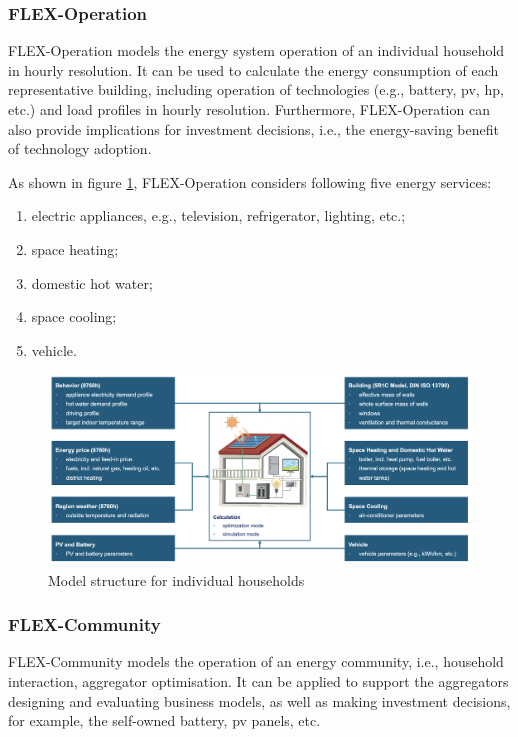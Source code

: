 \subsubsection{FLEX-Operation}


FLEX-Operation models the energy system operation of an individual household in hourly resolution.  
It can be used to calculate the energy consumption of each representative building, including operation of technologies (e.g., battery, \gls{pv}, \gls{hp}, etc.) and load profiles in hourly resolution. 
Furthermore, FLEX-Operation can also provide implications for investment decisions, i.e., the energy-saving benefit of technology adoption. 

As shown in figure \ref{fig:flex-operation}, FLEX-Operation considers following five energy services:

\begin{enumerate}
  \item electric appliances, e.g., television, refrigerator, lighting, etc.;
  \item space heating;
  \item domestic hot water;
  \item space cooling;
  \item vehicle. 
\end{enumerate}

\begin{figure}[h]
  \centering
  \includegraphics[width=\textwidth]{Images/flex-operation.png}
  \caption{Model structure for individual households}
  \label{fig:flex-operation}
\end{figure}


\subsubsection{FLEX-Community}


FLEX-Community models the operation of an energy community, i.e., household interaction, aggregator optimisation. 
It can be applied to support the aggregators designing and evaluating business models, as well as making investment decisions, for example, the self-owned battery, \gls{pv} panels, etc.


